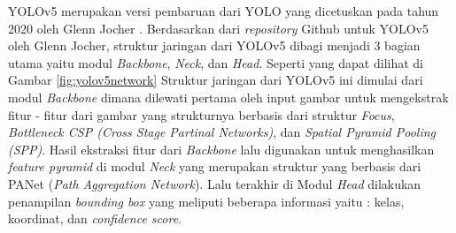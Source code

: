 \par YOLOv5 merupakan versi pembaruan dari YOLO yang dicetuskan pada tahun 2020 oleh Glenn Jocher \cite{glenn_jocher_yolov5}. Berdasarkan dari \emph{repository} Github untuk YOLOv5 oleh Glenn Jocher, struktur jaringan dari YOLOv5 dibagi menjadi 3 bagian utama yaitu modul \emph{Backbone}, \emph{Neck}, dan \emph{Head}. Seperti yang dapat dilihat di Gambar \ref{fig:yolov5network} Struktur jaringan dari YOLOv5 ini dimulai dari modul \emph{Backbone} dimana dilewati pertama oleh input gambar untuk mengekstrak fitur - fitur dari gambar yang strukturnya berbasis dari struktur \emph{Focus}, \emph{Bottleneck CSP (Cross Stage Partinal Networks)}, dan \emph{Spatial Pyramid Pooling (SPP)}. Hasil ekstraksi fitur dari \emph{Backbone} lalu digunakan untuk menghasilkan \emph{feature pyramid} di modul \emph{Neck} yang merupakan struktur yang berbasis dari PANet (\emph{Path Aggregation Network}). Lalu terakhir di Modul \emph{Head} dilakukan penampilan \emph{bounding box} yang meliputi beberapa informasi yaitu : kelas, koordinat, dan \emph{confidence score}.